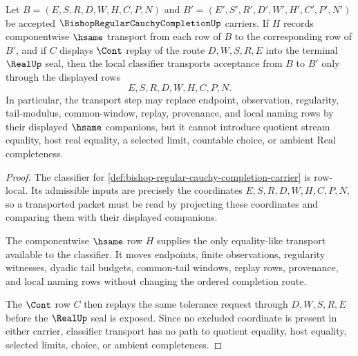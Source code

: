 \begin{theorem}
\label{thm:bishop-regular-cauchy-completion-classifier-transport}
Let $B=(E,S,R,D,W,H,C,P,N)$ and $B'=(E',S',R',D',W',H',C',P',N')$ be accepted $\BishopRegularCauchyCompletionUp$ carriers. If $H$ records componentwise $\hsame$ transport from each row of $B$ to the corresponding row of $B'$, and if $C$ displays $\Cont$ replay of the route $D,W,S,R,E$ into the terminal $\RealUp$ seal, then the local classifier transports acceptance from $B$ to $B'$ only through the displayed rows
$$
E,S,R,D,W,H,C,P,N .
$$
In particular, the transport step may replace endpoint, observation, regularity, tail-modulus, common-window, replay, provenance, and local naming rows by their displayed $\hsame$ companions, but it cannot introduce quotient stream equality, host real equality, a selected limit, countable choice, or ambient Real completeness.
\end{theorem}
\begin{proof}
The classifier for \autoref{def:bishop-regular-cauchy-completion-carrier} is row-local. Its admissible inputs are precisely the coordinates $E,S,R,D,W,H,C,P,N$, so a transported packet must be read by projecting these coordinates and comparing them with their displayed companions.

The componentwise $\hsame$ row $H$ supplies the only equality-like transport available to the classifier. It moves endpoints, finite observations, regularity witnesses, dyadic tail budgets, common-tail windows, replay rows, provenance, and local naming rows without changing the ordered completion route.

The $\Cont$ row $C$ then replays the same tolerance request through $D,W,S,R,E$ before the $\RealUp$ seal is exposed. Since no excluded coordinate is present in either carrier, classifier transport has no path to quotient equality, host equality, selected limits, choice, or ambient completeness.
\end{proof}

